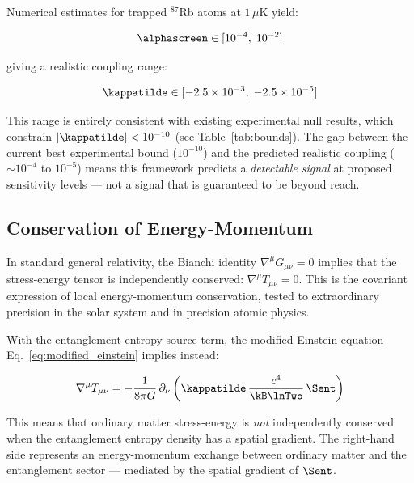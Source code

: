 Numerical estimates for trapped $^{87}$Rb atoms at $1\,\mu$K yield:

\begin{equation}
    \alphascreen \in [10^{-4},\;10^{-2}]
    \label{eq:alpha_range}
\end{equation}

\noindent giving a realistic coupling range:

\begin{equation}
    \kappatilde \in [-2.5\times10^{-3},\;-2.5\times10^{-5}]
    \label{eq:kappa_range}
\end{equation}

This range is entirely consistent with existing experimental null results,
which constrain $|\kappatilde| < 10^{-10}$ (see Table~\ref{tab:bounds}).
The gap between the current best experimental bound ($10^{-10}$) and the
predicted realistic coupling ($\sim 10^{-4}$ to $10^{-5}$) means this
framework predicts a \emph{detectable signal} at proposed sensitivity
levels --- not a signal that is guaranteed to be beyond reach.

\subsection{Conservation of Energy-Momentum}
\label{subsec:conservation}

In standard general relativity, the Bianchi identity $\nabla^\mu G_{\mu\nu}
= 0$ implies that the stress-energy tensor is independently conserved:
$\nabla^\mu T_{\mu\nu} = 0$. This is the covariant expression of local
energy-momentum conservation, tested to extraordinary precision in the
solar system and in precision atomic physics.

With the entanglement entropy source term, the modified Einstein equation
Eq.~\eqref{eq:modified_einstein} implies instead:

\begin{equation}
    \nabla^\mu T_{\mu\nu} = -\frac{1}{8\pi G}\,\partial_\nu
    \left(\kappatilde\,\frac{c^4}{\kB\lnTwo}\,\Sent\right)
    \label{eq:conservation_modified}
\end{equation}

\noindent This means that ordinary matter stress-energy is \emph{not}
independently conserved when the entanglement entropy density has a
spatial gradient. The right-hand side represents an energy-momentum
exchange between ordinary matter and the entanglement sector --- mediated
by the spatial gradient of $\Sent$.


